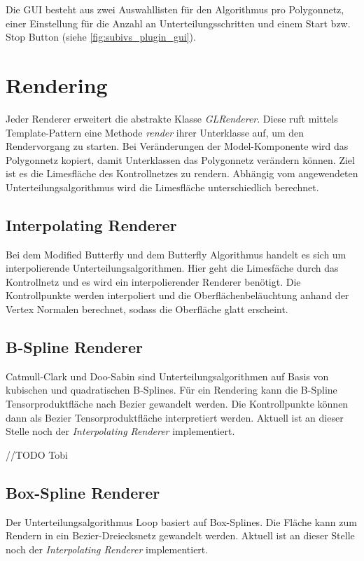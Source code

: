 Die GUI besteht aus zwei Auswahllisten für den Algorithmus pro Polygonnetz, einer Einstellung für die Anzahl an Unterteilungsschritten und einem Start bzw. Stop Button (siehe \autoref{fig:subivs_plugin_gui}).

\section{Rendering}

Jeder Renderer erweitert die abstrakte Klasse \emph{GLRenderer}. 
Diese ruft mittels Template-Pattern eine Methode \emph{render} ihrer Unterklasse auf, um den Rendervorgang zu starten.
Bei Veränderungen der Model-Komponente wird das Polygonnetz kopiert, damit Unterklassen das Polygonnetz verändern können.
Ziel ist es die Limesfläche des Kontrollnetzes zu rendern.
Abhängig vom angewendeten Unterteilungsalgorithmus wird die
Limesfläche unterschiedlich berechnet.

\subsection{Interpolating Renderer}
Bei dem Modified Butterfly und dem Butterfly Algorithmus handelt es sich um
interpolierende Unterteilungsalgorithmen.
Hier geht die Limesfäche durch das Kontrollnetz und es wird ein
interpolierender Renderer benötigt.
Die Kontrollpunkte werden interpoliert und die
Oberflächenbeläuchtung anhand der Vertex Normalen berechnet,
sodass die Oberfläche glatt erscheint.


\subsection{B-Spline Renderer}
Catmull-Clark und Doo-Sabin sind Unterteilungsalgorithmen auf Basis von
kubischen und quadratischen B-Splines.
Für ein Rendering kann die B-Spline Tensorproduktfläche nach Bezier gewandelt werden.
Die Kontrollpunkte können dann als Bezier Tensorproduktfläche interpretiert werden.
Aktuell ist an dieser Stelle noch der \emph{Interpolating Renderer} implementiert.

//TODO Tobi

\subsection{Box-Spline Renderer}
Der Unterteilungsalgorithmus Loop basiert auf Box-Splines.
Die Fläche kann zum Rendern in ein Bezier-Dreiecksnetz gewandelt werden.
Aktuell ist an dieser Stelle noch der \emph{Interpolating Renderer} implementiert.

